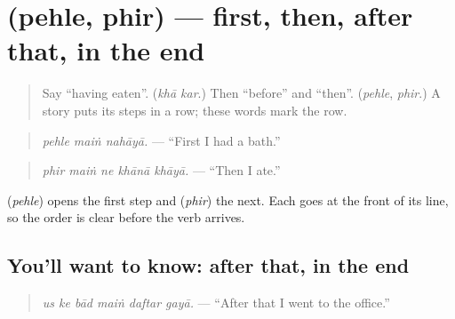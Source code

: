 \section[\texorpdfstring{\ur{پہلے،} \ur{پھر} (pehle, phir)}{پہلے، پھر (pehle, phir)}]{  (pehle, phir) — first, then, after that, in the end}

\label{lesson:UR-C267-pehle-phir}



\begin{quote}
Say \textquotedblleft{}having eaten\textquotedblright{}. (\emph{khā kar}.) Then \textquotedblleft{}before\textquotedblright{} and \textquotedblleft{}then\textquotedblright{}. (\emph{pehle}, \emph{phir}.) A story puts its steps in a row; these words mark the row.
\end{quote}

\begin{grammarlens}[title={Grammar Lens: first and then}]
\begin{quote}
\textbf{  }
\end{quote}

\begin{quote}
\emph{pehle maiṅ nahāyā.} — \textquotedblleft{}First I had a bath.\textquotedblright{}
\end{quote}

\begin{quote}
\textbf{    }
\end{quote}

\begin{quote}
\emph{phir maiṅ ne khānā khāyā.} — \textquotedblleft{}Then I ate.\textquotedblright{}
\end{quote}

\textbf{} (\emph{pehle}) opens the first step and \textbf{} (\emph{phir}) the next. Each goes at the front of its line, so the order is clear before the verb arrives.
\end{grammarlens}

\subsection*{You'll want to know: after that, in the end}
\begin{quote}
\textbf{     }
\end{quote}

\begin{quote}
\emph{us ke bād maiṅ daftar gayā.} — \textquotedblleft{}After that I went to the office.\textquotedblright{}
\end{quote}

